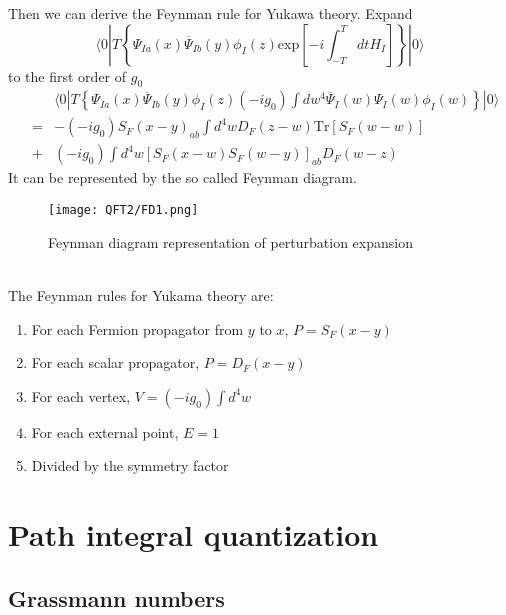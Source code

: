 \documentclass[cyan]{elegantnote}
\begin{document}
\noindent
Then we can derive the Feynman rule for Yukawa theory. 
Expand
\[\langle 0 | T \left\{ \Psi_{Ia}(x) \overline{\Psi}_{Ib}(y) \phi_I(z) \mathrm{exp} \left[ -i \int_{-T}^{T} dt H_I \right]\right\} | 0 \rangle\] 
to the first order of $g_0$
\begin{eqnarray}
& &\langle 0 | T \left\{ \Psi_{Ia}(x) \overline{\Psi}_{Ib}(y) \phi_I(z) (-i g_0) \int dw^4 \overline{\Psi}_I(w) \Psi_I(w) \phi_I(w) \right\} | 0 \rangle \nonumber \\
&=& -(-ig_0) S_F(x-y)_{ab} \int d^4 w D_F(z-w) \mathrm{Tr}[S_F(w-w)] \nonumber \\
&+&  (-ig_0) \int d^4 w  [S_F(x-w) S_F(w-y)]_{ab} D_F(w-z) \nonumber
\end{eqnarray}
It can be represented by the so called Feynman diagram.
\begin{figure}[!h]
\centering
\texttt{[image: QFT2/FD1.png]}
\caption{Feynman diagram representation of perturbation expansion}
\end{figure}\\
The Feynman rules for Yukama theory are:
\begin{enumerate}
\item For each Fermion propagator from $y$ to $x$, $P = S_F(x-y)$
\item For each scalar propagator, $P = D_F(x-y)$
\item For each vertex, $V = (-ig_0)\int d^4w$
\item For each external point, $E=1$
\item Divided by the symmetry factor
\end{enumerate}

\section{Path integral quantization}
\subsection{Grassmann numbers}
\end{document}
